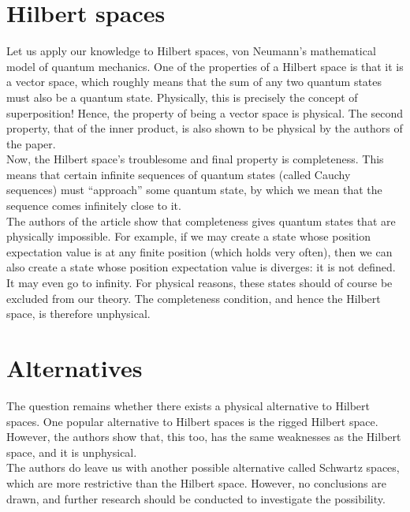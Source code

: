 \documentclass[12pt]{article}
\begin{document}
\begin{multicols}{2}
    \section*{Hilbert spaces}
    Let us apply our knowledge to Hilbert spaces, von Neumann's mathematical model of quantum mechanics. One of the properties of a Hilbert space is that it is a vector space, which roughly means that the sum of any two quantum states must also be a quantum state. Physically, this is precisely the concept of superposition! Hence, the property of being a vector space is physical. The second property, that of the inner product, is also shown to be physical by the authors of the paper.\\
    Now, the Hilbert space's troublesome and final property is completeness. This means that certain infinite sequences of quantum states (called Cauchy sequences) must ``approach'' some quantum state, by which we mean that the sequence comes infinitely close to it.\\
    The authors of the article show that completeness gives quantum states that are physically impossible. For example, if we may create a state whose position expectation value is at any finite position (which holds very often), then we can also create a state whose position expectation value is diverges: it is not defined. It may even go to infinity. For physical reasons, these states should of course be excluded from our theory. The completeness condition, and hence the Hilbert space, is therefore unphysical. 
    \section*{Alternatives}
    The question remains whether there exists a physical alternative to Hilbert spaces. One popular alternative to Hilbert spaces is the rigged Hilbert space\cite{de_la_madrid_role_2005}. However, the authors show that, this too, has the same weaknesses as the Hilbert space, and it is unphysical.\\
    The authors do leave us with another possible alternative called Schwartz spaces, which are more restrictive than the Hilbert space. However, no conclusions are drawn, and further research should be conducted to investigate the possibility.
\end{multicols}
\printbibliography
\end{document}
